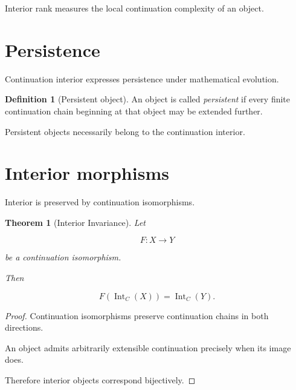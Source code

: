 \documentclass[13pt,openany]{book}
\theoremstyle{plain}
\newtheorem{theorem}{Theorem}[chapter]
\theoremstyle{definition}
\newtheorem{definition}{Definition}[chapter]
\begin{document}
Interior rank measures the local continuation complexity of an object.


\section{Persistence}

Continuation interior expresses persistence under mathematical evolution.

\begin{definition}[Persistent object]

An object is called \emph{persistent} if every finite continuation chain
beginning at that object may be extended further.

\end{definition}

Persistent objects necessarily belong to the continuation interior.


\section{Interior morphisms}

Interior is preserved by continuation isomorphisms.

\begin{theorem}[Interior Invariance]

Let

\[
F:X\rightarrow Y
\]

be a continuation isomorphism.

Then

\[
F
\left(
\operatorname{Int}_C(X)
\right)
=
\operatorname{Int}_C(Y).
\]

\end{theorem}

\begin{proof}

Continuation isomorphisms preserve continuation chains in both directions.

An object admits arbitrarily extensible continuation precisely when its image
does.

Therefore interior objects correspond bijectively.

\end{proof}

\end{document}
